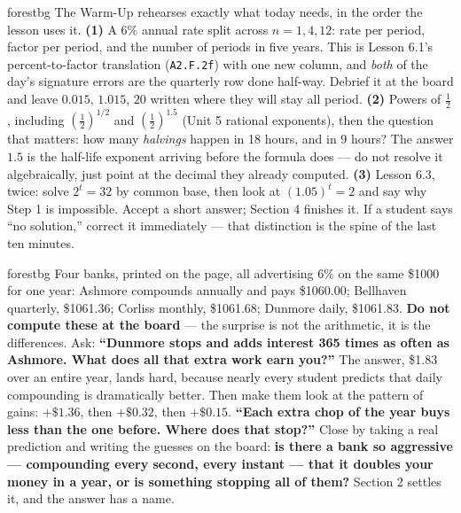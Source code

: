 \documentclass[10pt]{article}
\begin{document}
\begin{fixedskillbox}{forestbg}
    The Warm-Up rehearses exactly what today needs, in the order the lesson uses it. \textbf{(1)} A
    $6\%$ annual rate split across $n=1,4,12$: rate per period, factor per period, and the number of
    periods in five years. This is Lesson 6.1's percent-to-factor translation (\texttt{A2.F.2f}) with
    one new column, and \emph{both} of the day's signature errors are the quarterly row done half-way.
    Debrief it at the board and leave $0.015$, $1.015$, $20$ written where they will stay all period.
    \textbf{(2)} Powers of $\frac12$, including $\left(\frac12\right)^{1/2}$ and
    $\left(\frac12\right)^{1.5}$ (Unit 5 rational exponents), then the question that matters: how many
    \emph{halvings} happen in 18 hours, and in 9 hours? The answer $1.5$ is the half-life exponent
    arriving before the formula does --- do not resolve it algebraically, just point at the decimal
    they already computed. \textbf{(3)} Lesson 6.3, twice: solve $2^{t}=32$ by common base, then look
    at $(1.05)^{t}=2$ and say why Step 1 is impossible. Accept a short answer; Section 4 finishes it.
    If a student says ``no solution,'' correct it immediately --- that distinction is the spine of the
    last ten minutes.
\end{fixedskillbox}

\begin{skillbox}[Hook]{forestbg}
    Four banks, printed on the page, all advertising $6\%$ on the same \$1000 for one year: Ashmore
    compounds annually and pays \$1060.00; Bellhaven quarterly, \$1061.36; Corliss monthly, \$1061.68;
    Dunmore daily, \$1061.83. \textbf{Do not compute these at the board} --- the surprise is not the
    arithmetic, it is the differences. Ask: \textbf{``Dunmore stops and adds interest 365 times as often
    as Ashmore. What does all that extra work earn you?''} The answer, \$1.83 over an entire year, lands
    hard, because nearly every student predicts that daily compounding is dramatically better. Then make
    them look at the pattern of gains: $+\$1.36$, then $+\$0.32$, then $+\$0.15$. \textbf{``Each extra
    chop of the year buys less than the one before. Where does that stop?''} Close by taking a real
    prediction and writing the guesses on the board: \textbf{is there a bank so aggressive --- compounding
    every second, every instant --- that it doubles your money in a year, or is something stopping all of
    them?} Section 2 settles it, and the answer has a name.
\end{skillbox}
\end{document}
